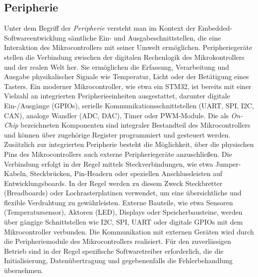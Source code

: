 %




\subsection{Peripherie}
Unter dem Begriff der \emph{Peripherie} versteht man im Kontext der Embedded-Softwareentwicklung sämtliche Ein- und Ausgabeschnittstellen, die eine Interaktion des Mikrocontrollers mit seiner Umwelt ermöglichen.
Peripheriegeräte stellen die Verbindung zwischen der digitalen Rechenlogik des Mikrokontrollers und der realen Welt her.
Sie ermöglichen die Erfassung, Verarbeitung und Ausgabe physikalischer Signale wie Temperatur, Licht oder der Betätigung eines Tasters.
Ein moderner Mikrocontroller, wie etwa ein STM32, ist bereits mit einer Vielzahl an integrierten Peripherieeinheiten ausgestattet, darunter digitale Ein-/Ausgänge (GPIOs), serielle Kommunikationsschnittstellen (UART, SPI, I2C, CAN), analoge Wandler (ADC, DAC), Timer oder PWM-Module. 
Die als \emph{On-Chip} bezeichneten Komponenten sind integraler Bestandteil des Mikrocontrollers und können über zugehörige Register programmiert und gesteuert werden.
Zusätzlich zur integrierten Peripherie besteht die Möglichkeit, über die physischen Pins des Mikrocontrollers auch externe Peripheriegeräte anzuschließen. 
Die Verbindung erfolgt in der Regel mittels Steckverbindungen, wie etwa Jumper-Kabeln, Steckbrücken, Pin-Headern oder speziellen Anschlussleisten auf Entwicklungsboards. 
In der Regel werden zu diesem Zweck Steckbretter (Breadboards) oder Lochrasterplatinen verwendet, um eine übersichtliche und flexible Verdrahtung zu gewährleisten. 
Externe Bauteile, wie etwa Sensoren (Temperatursensor), Aktoren (LED), Displays oder Speicherbausteine, werden über gängige Schnittstellen wie I2C, SPI, UART oder digitale GPIOs mit dem Mikrocontroller verbunden.
Die Kommunikation mit externen Geräten wird durch die Peripheriemodule des Mikrocontrollers realisiert. 
Für den zuverlässigen Betrieb sind in der Regel spezifische Softwaretreiber erforderlich, die die Initialisierung, Datenübertragung und gegebenenfalls die Fehlerbehandlung übernehmen.

